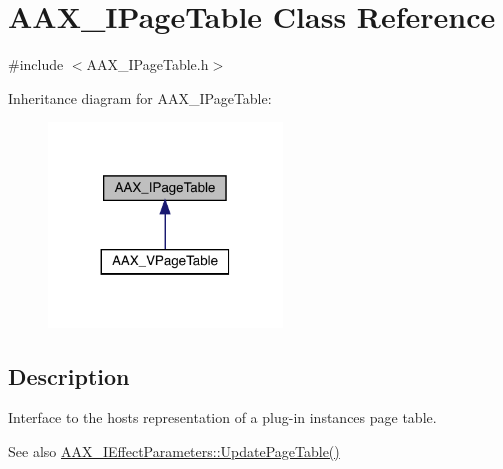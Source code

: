 \hypertarget{a01849}{}\section{A\+A\+X\+\_\+\+I\+Page\+Table Class Reference}
\label{a01849}


{\ttfamily \#include $<$A\+A\+X\+\_\+\+I\+Page\+Table.\+h$>$}



Inheritance diagram for A\+A\+X\+\_\+\+I\+Page\+Table\+:
\nopagebreak
\begin{figure}[H]
\begin{center}
\leavevmode
\includegraphics[width=176pt]{a01848}
\end{center}
\end{figure}


\subsection{Description}
Interface to the host\textquotesingle{}s representation of a plug-\/in instance\textquotesingle{}s page table. 

\begin{DoxySeeAlso}{See also}
\mbox{\hyperlink{a01685_a4cdb043ffbdca6f6c4a7e9a96a4347a2}{A\+A\+X\+\_\+\+I\+Effect\+Parameters\+::\+Update\+Page\+Table()}} 
\end{DoxySeeAlso}
